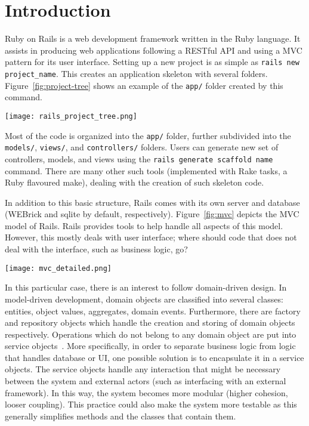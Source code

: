 \chapter{Introduction}

Ruby on Rails is a web development framework written in the Ruby language. It assists in producing web applications following a RESTful API and using a MVC pattern for its user interface. Setting up a new project is as simple as  {\lstinline |rails new project_name|}. This creates an application skeleton with several folders. Figure~\ref{fig:project-tree} shows an example of the {\lstinline |app/|} folder created by this command.

\begin{center}
    \texttt{[image: rails\_project\_tree.png]}
    \label{fig:project-tree}
\end{center}
Most of the code is organized into the {\lstinline |app/|} folder, further subdivided into the {\lstinline |models/|}, {\lstinline |views/|}, and {\lstinline |controllers/|} folders. Users can generate new set of controllers, models, and views using the {\lstinline |rails generate scaffold name|} command. There are many other such tools (implemented with Rake tasks, a Ruby flavoured make), dealing with the creation of such skeleton code.

In addition to this basic structure, Rails comes with its own server and database (WEBrick and sqlite by default, respectively). Figure~\ref{fig:mvc} depicts the MVC model of Rails. Rails provides tools to help handle all aspects of this model. However, this mostly deals with user interface; where should code that does not deal with the interface, such as business logic, go? 
\begin{center}
    \texttt{[image: mvc\_detailed.png]}
    \label{fig:mvc}
\end{center}
In this particular case, there is an interest to follow domain-driven design. In model-driven development, domain objects are classified into several classes: entities, object values, aggregates, domain events. Furthermore, there are factory and repository objects which handle the creation and storing of domain objects respectively. Operations which do not belong to any domain object are put into service objects~\cite{ddd-source}. More specifically, in order to separate business logic from logic that handles database or UI, one possible solution is to encapsulate it in a service objects. The service objects handle any interaction that might be necessary between the system and external actors (such as interfacing with an external framework). In this way, the system becomes more modular (higher cohesion, looser coupling). This practice could also make the system more testable as this generally simplifies methods and the classes that contain them. 

